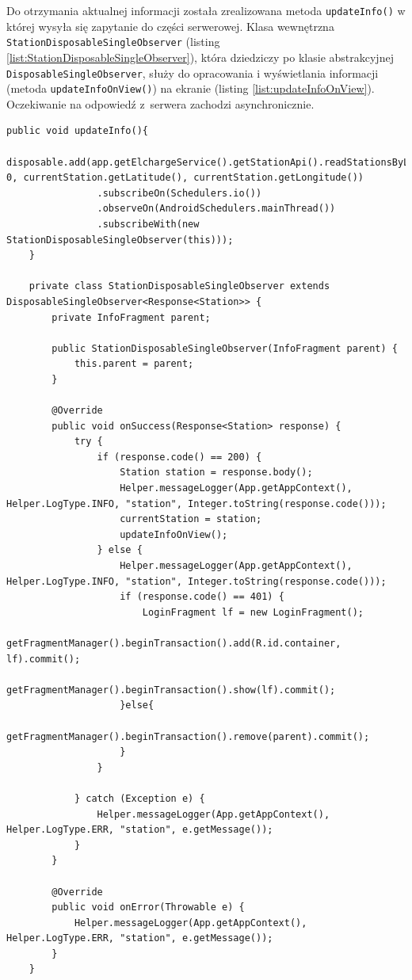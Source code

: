 Do otrzymania aktualnej informacji została zrealizowana metoda \texttt{updateInfo()} w której wysyła się zapytanie do części serwerowej.
Klasa wewnętrzna \texttt{StationDisposableSingleObserver} (listing \ref{list:StationDisposableSingleObserver}), która dziedziczy po klasie abstrakcyjnej \texttt{DisposableSingleObserver}, służy do opracowania i wyświetlania informacji (metoda \texttt{updateInfoOnView()}) na ekranie (listing \ref{list:updateInfoOnView}).
Oczekiwanie na odpowiedź z~serwera zachodzi asynchronicznie.
\begin{lstlisting}[label=list:StationDisposableSingleObserver,caption=Wczytanie danych stacji z części serwerowej.,basicstyle=\tiny\ttfamily]
    public void updateInfo(){
        disposable.add(app.getElchargeService().getStationApi().readStationsByLatAndLng(0, 0, currentStation.getLatitude(), currentStation.getLongitude())
                .subscribeOn(Schedulers.io())
                .observeOn(AndroidSchedulers.mainThread())
                .subscribeWith(new StationDisposableSingleObserver(this)));
    }

    private class StationDisposableSingleObserver extends DisposableSingleObserver<Response<Station>> {
        private InfoFragment parent;

        public StationDisposableSingleObserver(InfoFragment parent) {
            this.parent = parent;
        }

        @Override
        public void onSuccess(Response<Station> response) {
            try {
                if (response.code() == 200) {
                    Station station = response.body();
                    Helper.messageLogger(App.getAppContext(), Helper.LogType.INFO, "station", Integer.toString(response.code()));
                    currentStation = station;
                    updateInfoOnView();
                } else {
                    Helper.messageLogger(App.getAppContext(), Helper.LogType.INFO, "station", Integer.toString(response.code()));
                    if (response.code() == 401) {
                        LoginFragment lf = new LoginFragment();
                        getFragmentManager().beginTransaction().add(R.id.container, lf).commit();
                        getFragmentManager().beginTransaction().show(lf).commit();
                    }else{
                        getFragmentManager().beginTransaction().remove(parent).commit();
                    }
                }

            } catch (Exception e) {
                Helper.messageLogger(App.getAppContext(), Helper.LogType.ERR, "station", e.getMessage());
            }
        }

        @Override
        public void onError(Throwable e) {
            Helper.messageLogger(App.getAppContext(), Helper.LogType.ERR, "station", e.getMessage());
        }
    }
\end{lstlisting}

